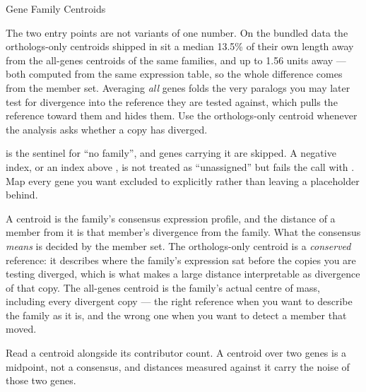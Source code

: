 \begin{recipe}[label=sub:family-centroids]{Gene Family Centroids}
\begin{pitfall}
  The two entry points are not variants of one number. On the bundled data
  the orthologs-only centroids shipped in
   sit a median 13.5\% of their
  own length away from the all-genes centroids of the same families, and up
  to 1.56 units away --- both computed from the same expression table, so the
  whole difference comes from the member set. Averaging \emph{all} genes folds
  the very paralogs you may later test for divergence into the reference they
  are tested against, which pulls the reference toward them and hides them.
  Use the orthologs-only centroid whenever the analysis asks whether a copy
  has diverged.
\end{pitfall}

\begin{pitfall}
   is the sentinel for ``no family'', and genes carrying it are
  skipped. A negative index, or an index above , is not
  treated as ``unassigned'' but fails the call with
  .
  Map every gene you want excluded to  explicitly rather than leaving
  a placeholder behind.
\end{pitfall}

\begin{interpretation}
  A centroid is the family's consensus expression profile, and the distance
  of a member from it is that member's divergence from the family. What the
  consensus \emph{means} is decided by the member set. The orthologs-only
  centroid is a \emph{conserved} reference: it describes where the family's
  expression sat before the copies you are testing diverged, which is what
  makes a large distance interpretable as divergence of that copy. The
  all-genes centroid is the family's actual centre of mass, including every
  divergent copy --- the right reference when you want to describe the family
  as it is, and the wrong one when you want to detect a member that moved.

  Read a centroid alongside its contributor count. A centroid over two genes
  is a midpoint, not a consensus, and distances measured against it carry the
  noise of those two genes.
\end{interpretation}

\begin{references}
\end{references}

\end{recipe}
